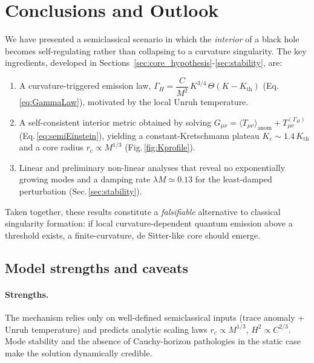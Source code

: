 \section{Conclusions and Outlook}
\label{sec:conclusions}

We have presented a semiclassical scenario in which the \emph{interior} of a black hole becomes self-regulating rather than collapsing to a curvature singularity. The key ingredients, developed in Sections~\ref{sec:core_hypothesis}-\ref{sec:stability}, are:

\begin{enumerate}[leftmargin=*]
    \item A curvature-triggered emission law, \(\displaystyle \Gamma_H = \dfrac{C}{M^{2}}\, K^{3/4}\, \Theta(K-K_{\mathrm{th}})\) (Eq.\,\eqref{eq:GammaLaw}), motivated by the local Unruh temperature.
    \item A self-consistent interior metric obtained by solving \(G_{\mu\nu} =\langle T_{\mu\nu}\rangle_{\text{anom}} +T_{\mu\nu}^{(\Gamma_H)}\) (Eq.\,\eqref{eq:semiEinstein}), yielding a constant-Kretschmann plateau \(K_c\sim1.4\,K_{\mathrm{th}}\) and a core radius \(r_c\propto M^{1/3}\) (Fig.\,\ref{fig:Kprofile}).
    \item Linear and preliminary non-linear analyses that reveal no exponentially growing modes and a damping rate \(\lambda M\simeq0.13\) for the least-damped perturbation (Sec.\,\ref{sec:stability}).
\end{enumerate}

Taken together, these results constitute a \emph{falsifiable} alternative to classical singularity formation: if local curvature-dependent quantum emission above a threshold exists, a finite-curvature, de Sitter-like core should emerge.

\subsection{Model strengths and caveats}

\paragraph{Strengths.}
The mechanism relies only on well-defined semiclassical inputs (trace anomaly + Unruh temperature) and predicts analytic scaling laws \(r_c\!\propto\!M^{1/3}\), \(H^{2}\!\propto\!C^{2/3}\). Mode stability and the absence of Cauchy-horizon pathologies in the static case make the solution dynamically credible.

